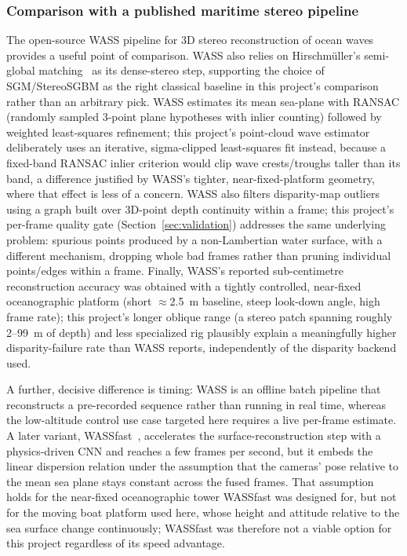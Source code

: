 \subsubsection*{Comparison with a published maritime stereo pipeline}

The open-source WASS pipeline for 3D stereo reconstruction of ocean waves~\cite{bergamasco2017wass} provides a useful point of comparison. WASS also relies on Hirschmüller's semi-global matching~\cite{hirschmuller2008stereo} as its dense-stereo step, supporting the choice of SGM/StereoSGBM as the right classical baseline in this project's comparison rather than an arbitrary pick. WASS estimates its mean sea-plane with RANSAC (randomly sampled 3-point plane hypotheses with inlier counting) followed by weighted least-squares refinement; this project's point-cloud wave estimator deliberately uses an iterative, sigma-clipped least-squares fit instead, because a fixed-band RANSAC inlier criterion would clip wave crests/troughs taller than its band, a difference justified by WASS's tighter, near-fixed-platform geometry, where that effect is less of a concern. WASS also filters disparity-map outliers using a graph built over 3D-point depth continuity within a frame; this project's per-frame quality gate (Section~\ref{sec:validation}) addresses the same underlying problem: spurious points produced by a non-Lambertian water surface, with a different mechanism, dropping whole bad frames rather than pruning individual points/edges within a frame. Finally, WASS's reported sub-centimetre reconstruction accuracy was obtained with a tightly controlled, near-fixed oceanographic platform (short $\approx$2.5~m baseline, steep look-down angle, high frame rate); this project's longer oblique range (a stereo patch spanning roughly 2--99~m of depth) and less specialized rig plausibly explain a meaningfully higher disparity-failure rate than WASS reports, independently of the disparity backend used.

A further, decisive difference is timing: WASS is an offline batch pipeline that reconstructs a pre-recorded sequence rather than running in real time, whereas the low-altitude control use case targeted here requires a live per-frame estimate. A later variant, WASSfast~\cite{rs13183780}, accelerates the surface-reconstruction step with a physics-driven CNN and reaches a few frames per second, but it embeds the linear dispersion relation under the assumption that the cameras' pose relative to the mean sea plane stays constant across the fused frames. That assumption holds for the near-fixed oceanographic tower WASSfast was designed for, but not for the moving boat platform used here, whose height and attitude relative to the sea surface change continuously; WASSfast was therefore not a viable option for this project regardless of its speed advantage.